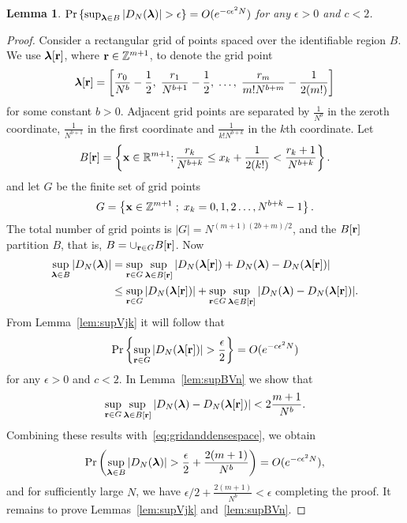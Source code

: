 \documentclass[aap]{imsart}
\newcommand{\reals}{{\mathbb R}}
\newcommand{\ints}{{\mathbb Z}}
\newcommand{\prob}{\operatorname{Pr}}
\renewcommand{\mid}{\; ; \;}
\newcommand{\abs}[1]{\left\vert #1 \right\vert}
\newcommand{\sabs}[1]{\vert #1 \vert}
\newtheorem{lemma}{Lemma}
\begin{document}
\begin{lemma} \label{lem:vn} $\prob \left\{ \sup_{\lambdabf \in B}\abs{ D_N(\lambdabf) } > \epsilon \right\} = O(e^{-c \epsilon^2 N})$ for any $\epsilon > 0$ and $c < 2$.
 \end{lemma}
\begin{proof}
Consider a rectangular grid of points spaced over the identifiable region $B$.  We use $\boldsymbol{\lambda}[\mathbf{r}]$, where $\rbf \in \ints^{m+1}$, to denote the grid point 
\[ 
 \boldsymbol{\lambda}[\mathbf{r}] = \left[  \frac{r_0}{N^{b}} - \frac{1}{2}, \; \frac{r_1}{N^{b+1}} - \frac{1}{2}, \; \dots, \; \frac{r_m}{m!N^{b+m}} - \frac{1}{2(m!) }\right]
\]
 for some constant $b>0$.  Adjacent grid points are separated by $\tfrac{1}{N^b}$ in the zeroth coordinate, $\tfrac{1}{N^{b+1}}$ in the first coordinate and $\tfrac{1}{k!N^{b+k}}$ in the $k$th coordinate. Let
 \[
 B[\rbf]=\left\{  \xbf\in\reals^{m+1}  ; \frac{r_k}{N^{b+k}}\leq x_k + \frac{1}{2(k!)} < \frac{r_k + 1}{N^{b+k}} \right\}  .
 \]
and let $G$ be the finite set of grid points
\[
G = \left\{ \xbf \in \ints^{m+1} \mid x_k = 0,1,2\dots,N^{b+k}-1  \right\}.
\]
The total number of grid points is $|G| = N^{(m+1)(2b + m)/2}$, and the $B[\mathbf{r}]$ partition $B$, that is, $B = \cup_{\mathbf{r} \in G}B[\mathbf{r}]$.  Now 
\begin{align}
 \sup_{\lambdabf \in B}\sabs{ D_N(\lambdabf) }  &= \sup_{\rbf \in G}\sup_{ \lambdabf \in B[\rbf]}\sabs{ D_N(\lambdabf[\rbf]) + D_N(\lambdabf) - D_N(\lambdabf[\rbf])  } \nonumber \\
 &\leq \sup_{\rbf \in G}\sabs{ D_N(\lambdabf[\rbf])} + \sup_{\rbf \in G}\sup_{\lambdabf\in B[\rbf]}\sabs{ D_N(\lambdabf) - D_N(\lambdabf[\rbf])  }. \label{eq:gridanddensespace}
 \end{align}
From Lemma~\ref{lem:supVjk} it will follow that
\[
\prob\left\{   \sup_{\rbf \in G }\abs{ D_N(\lambdabf[\rbf])  } > \frac{\epsilon}{2} \right\} = O(e^{-c \epsilon^2 N})
\]
for any $\epsilon > 0$ and $c < 2$.  In Lemma~\ref{lem:supBVn} we show that
\[
\sup_{\rbf \in G}\sup_{\lambdabf\in B[\rbf]}\abs{ D_N(\lambdabf) - D_N(\lambdabf[\rbf])} < 2\frac{m+1}{N^b}.
\]
Combining these results with~\eqref{eq:gridanddensespace}, we obtain
\[
\prob\left(\sup_{\lambdabf \in B }\sabs{ D_N(\lambdabf)} > \frac{\epsilon}{2} +  \frac{2(m+1)}{N^b} \right) = O(e^{-c \epsilon^2 N}),
\]
and for sufficiently large $N$, we have $\epsilon/2 + \frac{2(m+1)}{N^b} < \epsilon$ completing the proof.  It remains to prove Lemmas~\ref{lem:supVjk} and~\ref{lem:supBVn}.
\end{proof}
\end{document}
